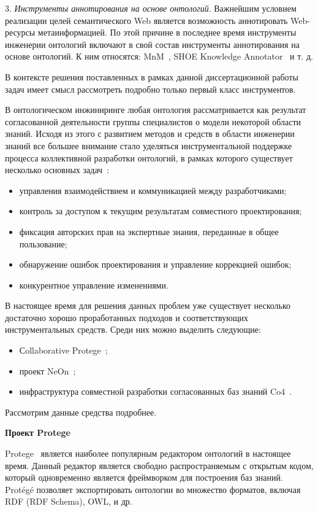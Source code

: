3. \textit{Инструменты аннотирования на основе онтологий}. Важнейшим условием реализации целей семантического Web является возможность аннотировать Web-ресурсы метаинформацией. По этой причине в последнее время инструменты инженерии онтологий включают в свой состав инструменты аннотирования на основе онтологий. К ним относятся: MnM~\cite{Varges-Vera2002}, SHOE Knowledge Annotator~\cite{HEflin2009} и т. д. 

В контексте решения поставленных в рамках данной диссертационной работы задач имеет смысл рассмотреть подробно только первый класс инструментов. 

В онтологическом инжиниринге любая онтология рассматривается как результат согласованной деятельности группы специалистов о модели некоторой области знаний. Исходя из этого с развитием методов и средств в области инженерии знаний все большее внимание стало уделяться инструментальной поддержке процесса коллективной разработки онтологий, в рамках которого существует несколько основных задач~\cite{Efimenko2011,TuzovskiSystem2011}:
\begin{itemize}
    \item управления взаимодействием и коммуникацией между разработчиками;
    \item контроль за доступом к текущим результатам совместного проектирования; 
    \item фиксация авторских прав на экспертные знания, переданные в общее пользование;
    \item обнаружение ошибок проектирования и управление коррекцией ошибок;
    \item конкурентное управление изменениями.
\end{itemize}

В настоящее время для решения данных проблем уже существует несколько достаточно хорошо проработанных подходов и соответствующих инструментальных средств. Среди них можно выделить следующие:
\begin{itemize}
    \item Сollaborative Protege~\cite{Tudorache2008};
    \item проект NeOn~\cite{Gomez2009}; 
    \item инфраструктура совместной разработки согласованных баз знаний Co4~\cite{Euzenat1996}.
\end{itemize}

Рассмотрим данные средства подробнее.

\textbf{Проект Protege}

Protege~\cite{Efimenko2011, Protege2016, Tudorache2008} является наиболее популярным редактором онтологий в настоящее время. Данный редактор является свободно распространяемым с открытым кодом, который одновременно является фреймворком для построения баз знаний. Protégé позволяет экспортировать онтологии во множество форматов, включая RDF (RDF Schema), OWL, и др.

